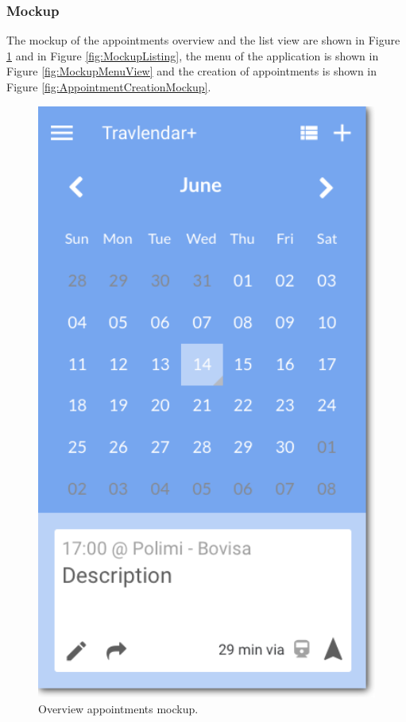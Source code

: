 \subsubsection{Mockup}
The mockup of the appointments overview and the list view are shown in Figure \ref{fig:MockupAppointments} and in Figure \ref{fig:MockupListing}, the menu of the application is shown in Figure \ref{fig:MockupMenuView} and the creation of appointments is shown in Figure \ref{fig:AppointmentCreationMockup}.
\begin{figure}
	\centering
	\includegraphics[width=4.5in]{./images/home.png}
	\caption{Overview appointments mockup.}
	\label{fig:MockupAppointments}
\end{figure}
